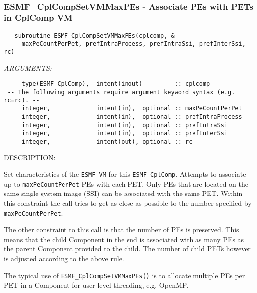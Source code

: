  
\mbox{}\hrulefill\ 
 
\subsubsection [ESMF\_CplCompSetVMMaxPEs] {ESMF\_CplCompSetVMMaxPEs - Associate PEs with PETs in CplComp VM}


  
\begin{verbatim}   subroutine ESMF_CplCompSetVMMaxPEs(cplcomp, &
     maxPeCountPerPet, prefIntraProcess, prefIntraSsi, prefInterSsi, rc)\end{verbatim}{\em ARGUMENTS:}
\begin{verbatim}     type(ESMF_CplComp),  intent(inout)         :: cplcomp
 -- The following arguments require argument keyword syntax (e.g. rc=rc). --
     integer,             intent(in),  optional :: maxPeCountPerPet
     integer,             intent(in),  optional :: prefIntraProcess
     integer,             intent(in),  optional :: prefIntraSsi
     integer,             intent(in),  optional :: prefInterSsi
     integer,             intent(out), optional :: rc\end{verbatim}
{\sf DESCRIPTION:\\ }


     Set characteristics of the {\tt ESMF\_VM} for this {\tt ESMF\_CplComp}.
     Attempts to associate up to {\tt maxPeCountPerPet} PEs with each PET. Only
     PEs that are located on the same single system image (SSI) can be associated
     with the same PET. Within this constraint the call tries to get as close as
     possible to the number specified by {\tt maxPeCountPerPet}.
  
     The other constraint to this call is that the number of PEs is preserved.
     This means that the child Component in the end is associated with as many
     PEs as the parent Component provided to the child. The number of child PETs
     however is adjusted according to the above rule.
  
     The typical use of {\tt ESMF\_CplCompSetVMMaxPEs()} is to allocate
     multiple PEs per PET in a Component for user-level threading, e.g. OpenMP.
  
